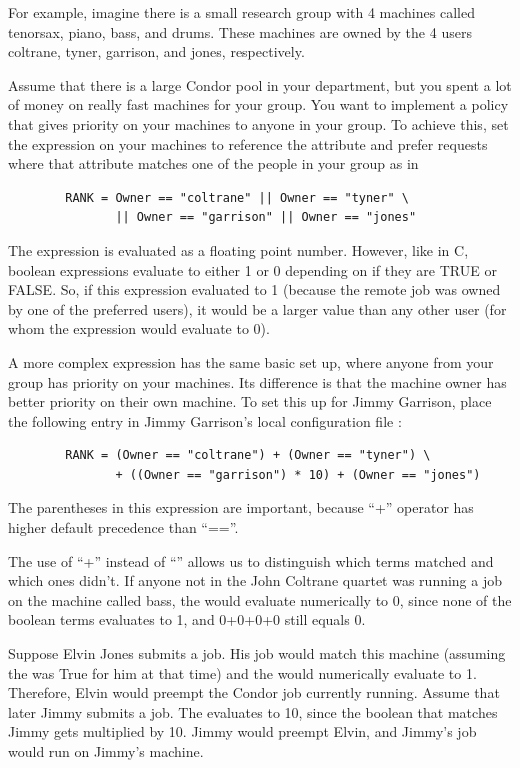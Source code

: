 For example, imagine there is a small research group with 4 machines
called tenorsax, piano, bass, and drums.
These machines are owned by the 4 users
coltrane, tyner, garrison, and jones,
respectively.  

Assume that there is a large Condor pool in your department,
but you spent a lot of money on really fast machines for your group.
You want to implement a policy
that gives priority on your machines to
anyone in your group.
To achieve this, set the 
expression on your machines to reference the  attribute and
prefer requests where that attribute matches one of the people in your
group as in
\begin{verbatim}
        RANK = Owner == "coltrane" || Owner == "tyner" \
               || Owner == "garrison" || Owner == "jones"
\end{verbatim}

The  expression is evaluated as a floating point number.
However, like in C, boolean expressions evaluate to either 1 or 0
depending on if they are TRUE or FALSE.
So, if this expression
evaluated to 1 (because the remote job was owned by one of the 
preferred users), it would be a larger value than any other
user (for whom the expression would evaluate to 0).

A more complex  expression
has the same basic set up,
where anyone from your group has priority on your machines.
Its difference is that
the machine owner has better priority on their own machine.
To set this up for Jimmy Garrison,
place the following entry in Jimmy Garrison's local
configuration file :
\begin{verbatim}
        RANK = (Owner == "coltrane") + (Owner == "tyner") \
               + ((Owner == "garrison") * 10) + (Owner == "jones")
\end{verbatim}
\Note The parentheses in this expression are important, because ``+''
      operator has higher default precedence than ``==''.

The use of ``+'' instead of ``\Bar\Bar'' allows us to 
distinguish which terms matched and which ones didn't.
If anyone not in the John Coltrane quartet was running a job on
the machine called bass,
the \Expr{RANK} would evaluate numerically to 0, since none
of the boolean terms evaluates to 1, and 0+0+0+0 still equals 0.

Suppose Elvin Jones submits a job.
His job would match this
machine (assuming the  was True for him at that time) and
the  would numerically evaluate to 1.
Therefore, Elvin would preempt the Condor job currently running.
Assume that later Jimmy submits a job.
The \Expr{RANK} evaluates to 10, since the boolean that matches Jimmy
gets multiplied by 10.
Jimmy would preempt Elvin, and Jimmy's job would run on
Jimmy's machine.

